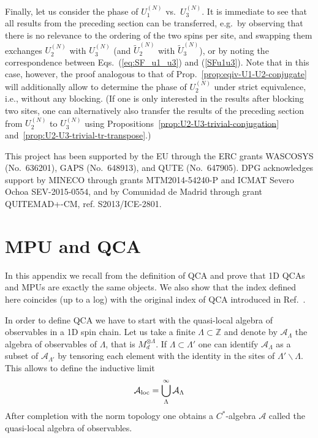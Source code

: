 \documentclass[pra,twocolumn,nofootinbib,superscriptaddress]{revtex4-1}
\begin{document}
Finally, let us consider the phase of $U_1^{(N)}$ vs.\ $U_3^{(N)}$.  It is
immediate to see that all results from the preceding section can be
transferred, e.g.\ by observing that there is no relevance to the ordering
of the two spins per site, and swapping them exchanges $U_2^{(N)}$ with
$U_3^{(N)}$ (and $\tilde U_2^{(N)}$ with $\tilde U_3^{(N)}$), or by noting
the correspondence between Eqs.~(\ref{eq:SF_u1_u3}) and (\ref{SFu1u3}).
Note that in this case, however, the proof analogous to that of
Prop.~\ref{prop:eqiv-U1-U2-conjugate} will additionally allow to determine
the phase of $U_2^{(N)}$ under strict equivalence, i.e., without any
blocking. (If one is only
interested in the results after blocking two sites, one can alternatively
also transfer the results of the preceding section from $U_2^{(N)}$ to
$U_3^{(N)}$ using Propositions~\ref{prop:U2-U3-trivial-conjugation}
and~\ref{prop:U2-U3-trivial-tr-transpose}.)







\begin{acknowledgements}
	This project has been supported by the EU through the ERC grants WASCOSYS
	(No.~636201), GAPS (No.~648913), and QUTE (No.~647905).
	DPG acknowledges support by MINECO through grants MTM2014-54240-P and
	ICMAT Severo Ochoa SEV-2015-0554, and by Comunidad de Madrid through grant
	QUITEMAD+-CM, ref. S2013/ICE-2801.



\end{acknowledgements}











\appendix

\section{MPU and QCA}

In this appendix we recall from \cite{schumacher:qca} the definition of
QCA and prove that 1D QCAs and MPUs are exactly the same objects. We also
show that the index defined here coincides (up to a log) with the original
index of QCA introduced in Ref.~\cite{gross:index-theorem}.

In order to define QCA we have to start with the quasi-local algebra of observables in a 1D spin chain. Let us take  a finite $\Lambda\subset \mathbb{Z}$ and denote by $\mathcal{A}_\Lambda$ the algebra of observables of $\Lambda$, that is $M_d^{\otimes \Lambda}$. If $\Lambda \subset \Lambda'$ one can identify $\mathcal{A}_\Lambda$ as a subset of $\mathcal{A}_{\Lambda'}$ by tensoring each element with the identity in the sites of $\Lambda'\backslash\Lambda$. This allows to define the inductive limit
\begin{equation}
	\mathcal{A}_{\rm loc}=\bigcup _{\Lambda}^\infty \mathcal{A}_\Lambda
\end{equation}
After completion with the norm topology one obtains a $C^*$-algebra ${\mathcal{A}}$ called the quasi-local algebra of observables.
\end{document}
